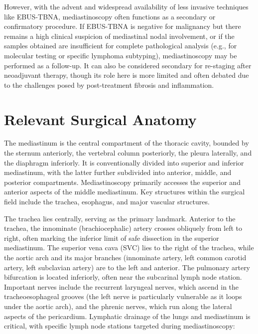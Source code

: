 However, with the advent and widespread availability of less invasive techniques like EBUS-TBNA, mediastinoscopy often functions as a secondary or confirmatory procedure. If EBUS-TBNA is negative for malignancy but there remains a high clinical suspicion of mediastinal nodal involvement, or if the samples obtained are insufficient for complete pathological analysis (e.g., for molecular testing or specific lymphoma subtyping), mediastinoscopy may be performed as a follow-up. It can also be considered secondary for re-staging after neoadjuvant therapy, though its role here is more limited and often debated due to the challenges posed by post-treatment fibrosis and inflammation.

\section*{Relevant Surgical Anatomy}
The mediastinum is the central compartment of the thoracic cavity, bounded by the sternum anteriorly, the vertebral column posteriorly, the pleura laterally, and the diaphragm inferiorly. It is conventionally divided into superior and inferior mediastinum, with the latter further subdivided into anterior, middle, and posterior compartments. Mediastinoscopy primarily accesses the superior and anterior aspects of the middle mediastinum. Key structures within the surgical field include the trachea, esophagus, and major vascular structures.

The trachea lies centrally, serving as the primary landmark. Anterior to the trachea, the innominate (brachiocephalic) artery crosses obliquely from left to right, often marking the inferior limit of safe dissection in the superior mediastinum. The superior vena cava (SVC) lies to the right of the trachea, while the aortic arch and its major branches (innominate artery, left common carotid artery, left subclavian artery) are to the left and anterior. The pulmonary artery bifurcation is located inferiorly, often near the subcarinal lymph node station. Important nerves include the recurrent laryngeal nerves, which ascend in the tracheoesophageal grooves (the left nerve is particularly vulnerable as it loops under the aortic arch), and the phrenic nerves, which run along the lateral aspects of the pericardium. Lymphatic drainage of the lungs and mediastinum is critical, with specific lymph node stations targeted during mediastinoscopy:

